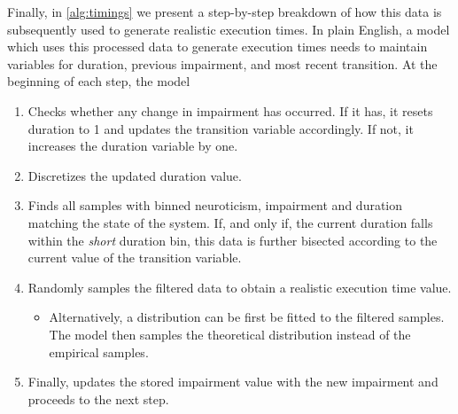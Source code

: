 Finally, in \cref{alg:timings} we present a step-by-step breakdown of how this data is subsequently used to generate realistic execution times.
In plain English, a model which uses this processed data to generate execution times needs to maintain variables for duration, previous impairment, and most recent transition.
At the beginning of each step, the model
\begin{enumerate}
    \item Checks whether any change in impairment has occurred.
          If it has, it resets duration to \num{1} and updates the transition variable accordingly.
          If not, it increases the duration variable by one.
    \item Discretizes the updated duration value.
    \item Finds all samples with binned neuroticism, impairment and duration matching the state of the system.
    If, and only if, the current duration falls within the \emph{short} duration bin, this data is further bisected according to the current value of the transition variable.
    \item Randomly samples the filtered data to obtain a realistic execution time value.
          \begin{itemize}
              \item Alternatively, a distribution can be first be fitted to the filtered samples.
                    The model then samples the theoretical distribution instead of the empirical samples.
          \end{itemize}
    \item Finally, updates the stored impairment value with the new impairment and proceeds to the next step.
\end{enumerate}

